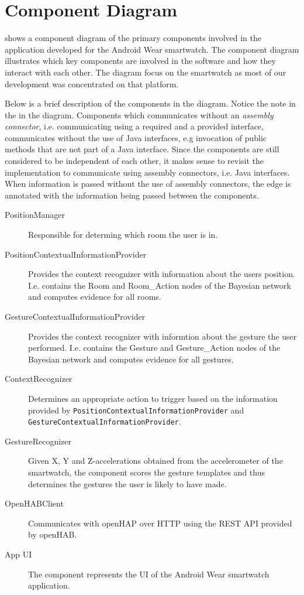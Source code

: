 \section{Component Diagram}
\label{sec:implementation:component-diagram}

 shows a component diagram of the primary components involved in the application developed for the Android Wear smartwatch. The component diagram illustrates which key components are involved in the software and how they interact with each other.
The diagram focus on the smartwatch as most of our development was concentrated on that platform.

Below is a brief description of the components in the diagram. Notice the note in the in the diagram. Components which communicates without an \emph{assembly connector}, i.e. communicating using a required and a provided interface, communicates without the use of Java interfaces, e.g invocation of public methods that are not part of a Java interface. Since the components are still considered to be independent of each other, it makes sense to revisit the implementation to communicate using assembly connectors, i.e. Java interfaces. When information is passed without the use of assembly connectors, the edge is annotated with the information being passed between the components.

\begin{description}
\item[PositionManager] Responsible for determing which room the user is in.
\item[PositionContextualInformationProvider] Provides the context recognizer with information about the users position. I.e. contains the Room and Room\_Action nodes of the Bayesian network and computes evidence for all rooms.
\item[GestureContextualInformationProvider] Provides the context recognizer with informtion about the gesture the user performed. I.e. contains the Gesture and Gesture\_Action nodes of the Bayesian network and computes evidence for all gestures.
\item[ContextRecognizer] Determines an appropriate action to trigger based on the information provided by \texttt{PositionContextualInformationProvider} and \texttt{GestureContextualInformationProvider}.
\item[GestureRecognizer] Given X, Y and Z-accelerations obtained from the accelerometer of the smartwatch, the component scores the gesture templates and thus determines the gestures the user is likely to have made.
\item[OpenHABClient] Communicates with openHAP over HTTP using the REST API provided by openHAB.
\item[App UI] The component represents the UI of the Android Wear smartwatch application.
\end{description}

